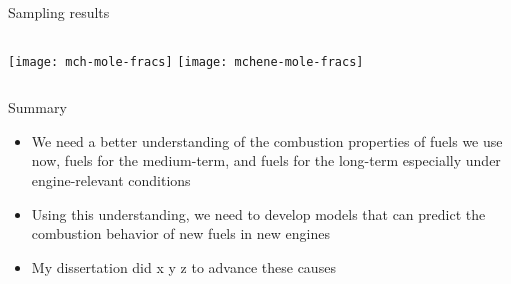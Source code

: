 \documentclass{beamer}
\begin{document}
\begin{frame}{Sampling results}
    \begin{columns}
            \centering
            \texttt{[image: mch-mole-fracs]}
            \texttt{[image: mchene-mole-fracs]}
    \end{columns}
\end{frame}

\begin{frame}{Summary}
    \begin{itemize}
        \item We need a better understanding of the combustion properties of fuels we use now, fuels for the medium-term, and fuels for the long-term especially under engine-relevant conditions
        \item Using this understanding, we need to develop models that can predict the combustion behavior of new fuels in new engines
        \item My dissertation did x y z to advance these causes
    \end{itemize}
\end{frame}
\end{document}
